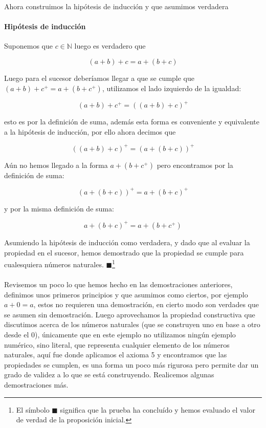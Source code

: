 \documentclass{article}
\begin{document}
Ahora construimos la hipótesis de inducción y que asumimos verdadera
\paragraph{Hipótesis de inducción} Suponemos que $c \in \mathbb{N}$ luego es verdadero que

$$(a + b) + c = a + (b + c)$$

Luego para el sucesor deberíamos llegar a que se cumple que $(a + b) + c^+ = a + (b + c^+)$, utilizamos el lado izquierdo de la igualdad:

    $$(a + b) + c^+ = ((a + b) + c)^+$$

esto es por la definición de suma, además esta forma es conveniente y equivalente a la hipótesis de inducción, por ello ahora decimos que

$$((a + b) + c)^+ = (a + (b + c))^+$$

Aún no hemos llegado a la forma $a + (b + c^+)$ pero encontramos por la definición de suma:

$$(a + (b + c))^+ = a + (b + c)^+$$

y por la misma definición de suma:

$$a + (b + c)^+ = a + (b + c^+)$$

Asumiendo la hipótesis de inducción como verdadera, y dado que al evaluar la propiedad en el sucesor, hemos demostrado que la propiedad se cumple para cualesquiera números naturales. $\blacksquare$\footnote{El símbolo $\blacksquare$ significa que la prueba ha concluído y hemos evaluado el valor de verdad de la proposición inicial.}

\paragraph{} Revisemos un poco lo que hemos hecho en las demostraciones anteriores, definimos unos primeros principios y que asumimos como ciertos, por ejemplo $a + 0 = a$, estos no requieren una demostración, en cierto modo son verdades que se asumen sin demostración. Luego aprovechamos la propiedad constructiva que discutimos acerca de los números naturales (que se construyen uno en base a otro desde el 0), únicamente que en este ejemplo no utilizamos ningún ejemplo numérico, sino literal, que representa cualquier elemento de los números naturales, aquí fue donde aplicamos el axioma 5 y encontramos que las propiedades se cumplen, es una forma un poco más rigurosa pero permite dar un grado de validez a lo que se está construyendo. Realicemos algunas demostraciones más.
\end{document}
